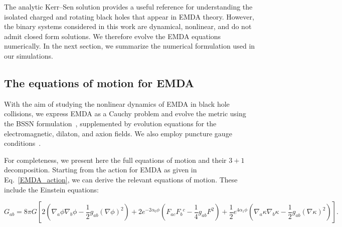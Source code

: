 The analytic Kerr--Sen solution provides a useful reference for understanding the isolated charged and rotating black holes that appear in EMDA theory. However, the binary systems considered in this work are dynamical, nonlinear, and do not admit closed form solutions. We therefore evolve the EMDA equations numerically. In the next section, we summarize the numerical formulation used in our simulations.



\subsection{The equations of motion for EMDA}
\label{sec:eom}
With the aim of studying the nonlinear dynamics of EMDA in black hole
collisions, we express EMDA as a Cauchy problem and evolve the
metric using the BSSN formulation~\cite{Shibata1995_BSSN,
Baumgarte1999_BSSN, Baumgarte2010}, supplemented by evolution equations for the electromagnetic, dilaton, and axion fields. 
We also employ puncture gauge conditions~\cite{Campanelli2006,Baker2006}.

For completeness, we present here the full equations of motion and their $3+1$ decomposition.
Starting from the action for EMDA as given in Eq.~\ref{EMDA_action}, we can derive the relevant equations of motion.    
These include the Einstein equations:

\begin{equation}
G_{ab}
=
8\pi G
\left[
2\left(\nabla_a\phi\nabla_b\phi-\frac{1}{2}g_{ab}(\nabla\phi)^2\right)
+
2e^{-2\alpha_0\phi}\left(F_{ac}F_b{}^c-\frac{1}{4}g_{ab}F^2\right)
+
\frac{1}{2}e^{4\alpha_1\phi}
\left(\nabla_a\kappa\nabla_b\kappa-\frac{1}{2}g_{ab}(\nabla\kappa)^2\right)
\right].
\label{eq:emda_first}
\end{equation}

